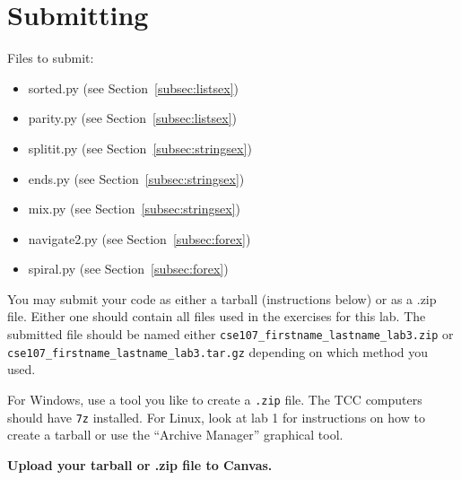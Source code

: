 \documentclass[11pt]{cselabheader}
\begin{document}
\pagebreak
\section{Submitting}

Files to submit:
\begin{itemize}
  \item sorted.py (see Section~\ref{subsec:listsex})
  \item parity.py (see Section~\ref{subsec:listsex})
  \item splitit.py (see Section~\ref{subsec:stringsex})
  \item ends.py (see Section~\ref{subsec:stringsex})
  \item mix.py (see Section~\ref{subsec:stringsex})
  \item navigate2.py (see Section~\ref{subsec:forex})
  \item spiral.py (see Section~\ref{subsec:forex})
\end{itemize}

You may submit your code as either a tarball (instructions below) or as a .zip
file. Either one should contain all files used in the exercises for this lab.
The submitted file should be named either
\texttt{cse107\_firstname\_lastname\_lab3.zip} or
\texttt{cse107\_firstname\_lastname\_lab3.tar.gz} depending on which method you
used.

For Windows, use a tool you like to create a \texttt{.zip} file. The TCC
computers should have \texttt{7z} installed. For Linux, look at lab 1 for
instructions on how to create a tarball or use the ``Archive Manager'' graphical
tool.

\begin{center}
  \textbf{Upload your tarball or .zip file to Canvas.}
\end{center}
\end{document}
